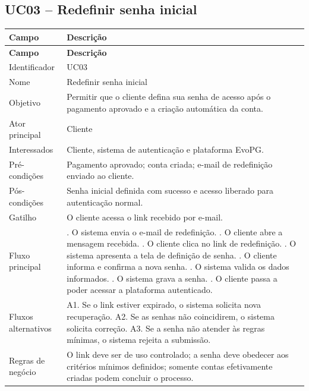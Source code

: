 \documentclass[
  12pt,
  openany,
  oneside,
  a4paper,
  brazil
]{abntex2}
\begin{document}
\subsection{UC03 -- Redefinir senha inicial}
\begin{longtable}{>{\raggedright\arraybackslash}p{3.3cm} >{\raggedright\arraybackslash}p{10cm}}
\toprule
\textbf{Campo} & \textbf{Descri\c{c}\~ao} \\
\midrule
\endfirsthead
\toprule
\textbf{Campo} & \textbf{Descri\c{c}\~ao} \\
\midrule
\endhead
Identificador & UC03 \\
Nome & Redefinir senha inicial \\
Objetivo & Permitir que o cliente defina sua senha de acesso ap\'os o pagamento aprovado e a cria\c{c}\~ao autom\'atica da conta. \\
Ator principal & Cliente \\
Interessados & Cliente, sistema de autentica\c{c}\~ao e plataforma EvoPG. \\
Pr\'e-condi\c{c}\~oes & Pagamento aprovado; conta criada; e-mail de redefini\c{c}\~ao enviado ao cliente. \\
P\'os-condi\c{c}\~oes & Senha inicial definida com sucesso e acesso liberado para autentica\c{c}\~ao normal. \\
Gatilho & O cliente acessa o link recebido por e-mail. \\
Fluxo principal & 1. O sistema envia o e-mail de redefini\c{c}\~ao. \newline 2. O cliente abre a mensagem recebida. \newline 3. O cliente clica no link de redefini\c{c}\~ao. \newline 4. O sistema apresenta a tela de defini\c{c}\~ao de senha. \newline 5. O cliente informa e confirma a nova senha. \newline 6. O sistema valida os dados informados. \newline 7. O sistema grava a senha. \newline 8. O cliente passa a poder acessar a plataforma autenticado. \\
Fluxos alternativos & A1. Se o link estiver expirado, o sistema solicita nova recupera\c{c}\~ao. \newline A2. Se as senhas n\~ao coincidirem, o sistema solicita corre\c{c}\~ao. \newline A3. Se a senha n\~ao atender \`as regras m\'inimas, o sistema rejeita a submiss\~ao. \\
Regras de neg\'ocio & O link deve ser de uso controlado; a senha deve obedecer aos crit\'erios m\'inimos definidos; somente contas efetivamente criadas podem concluir o processo. \\
\bottomrule
\end{longtable}
\end{document}

